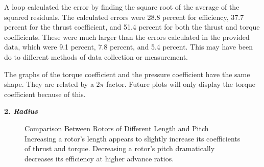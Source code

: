 \documentclass{article}
\begin{document}
A loop calculated the error by finding the square root of the average of the squared residuals. The calculated errors were 28.8 percent for efficiency, 37.7 percent for the thrust coefficient, and 51.4 percent for both the thrust and torque coefficients. These were much larger than the errors calculated in the provided data, which were 9.1 percent, 7.8 percent, and 5.4 percent. This may have been do to different methods of data collection or measurement. \newline

The graphs of the torque coefficient and the pressure coefficient have the same shape. They are related by a $2 \pi$ factor. Future plots will only display the torque coefficient because of this. \newline

\textbf{2. \emph{Radius}} \newline

\begin{figure}
  \centering
  \caption{Comparison Between Rotors of Different Length and Pitch \newline Increasing a rotor's length appears to slightly increase its coefficients of thrust and torque. Decreasing a rotor's pitch dramatically decreases its efficiency at higher advance ratios.}
  \label{fig:3}
\end{figure}
\end{document}
